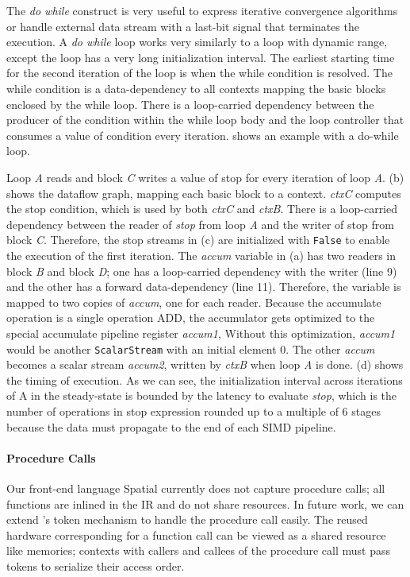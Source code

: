 The \emph{do while} construct is very useful to express iterative convergence algorithms or handle external
data stream with a last-bit signal that terminates the execution.
A \emph{do while} loop works very similarly to a loop with dynamic range, except the loop has a very long
initialization interval. The earliest starting time for the second iteration of the loop is when the while condition is resolved.
The while condition is a data-dependency to all contexts mapping the basic blocks enclosed by the while loop.
There is a loop-carried dependency between the producer of the condition within the while loop body
and the loop controller that consumes a value of condition every iteration.
 shows an example with a do-while loop.

Loop \emph{A} reads and block \emph{C} writes a value of stop for every iteration of loop
\emph{A}.
 (b) shows the dataflow graph, mapping each basic block to a context.
\emph{ctxC} computes the stop condition, which is used by both \emph{ctxC} and \emph{ctxB}.
There is a loop-carried dependency between the reader of \emph{stop} from loop \emph{A} and the
writer of stop from block \emph{C}. Therefore, the stop streams in (c) are initialized with 
\texttt{False} to enable the execution of the first iteration.
The \emph{accum} variable in (a) has two readers in block \emph{B} and block \emph{D}; one has a
loop-carried dependency with the writer (line 9) and the other has a forward data-dependency (line
11). 
Therefore, the variable is mapped to two copies of \emph{accum}, one for each reader. 
Because the accumulate operation is a single operation ADD, the accumulator gets optimized to the special
accumulate pipeline register \emph{accum1}, 
Without this optimization, \emph{accum1} would be another \texttt{ScalarStream} with an initial
element 0.
The other \emph{accum} becomes a scalar stream \emph{accum2}, written by \emph{ctxB} when loop \emph{A}
is done.
(d) shows the timing of execution. As we can see, the initialization interval across iterations of
A in the steady-state is bounded by the latency to evaluate \emph{stop}, which is the number of
operations in stop expression rounded up to a multiple of 6 stages because the data must
propagate to the end of each SIMD pipeline.

\paragraph{Procedure Calls}
Our front-end language Spatial currently does not capture procedure calls; 
all functions are inlined in the IR and do not share resources. 
In future work, we can extend \name's token mechanism to handle the procedure call easily. 
The reused hardware corresponding for a function call 
can be viewed as a shared resource like memories; contexts with callers and callees of the procedure call
must pass tokens to serialize their access order.

